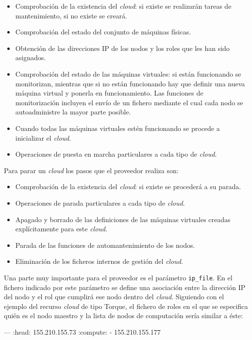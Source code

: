 \begin{itemize}
\item Comprobación de la existencia del \emph{cloud}: si existe se realizarán tareas de mantenimiento, si no existe se creará.
\item Comprobación del estado del conjunto de máquinas físicas.
\item Obtención de las direcciones IP de los nodos y los roles que les han sido asignados.
\item Comprobación del estado de las máquinas virtuales: si están funcionando se monitorizan, mientras que si no están funcionando hay que definir una nueva máquina virtual y ponerla en funcionamiento. Las funciones de monitorización incluyen el envío de un fichero mediante el cual cada nodo se autoadministre la mayor parte posible.
\item Cuando todas las máquinas virtuales estén funcionando se procede a inicializar el \emph{cloud}.
\item Operaciones de puesta en marcha particulares a cada tipo de \emph{cloud}.
\end{itemize}

Para parar un \emph{cloud} los pasos que el proveedor realiza son:

\begin{itemize}
\item Comprobación de la existencia del \emph{cloud}: si existe se procederá a su parada.
\item Operaciones de parada particulares a cada tipo de \emph{cloud}.
\item Apagado y borrado de las definiciones de las máquinas virtuales creadas explícitamente para este \emph{cloud}.
\item Parada de las funciones de automantenimiento de los nodos.
\item Eliminación de los ficheros internos de gestión del \emph{cloud}.
\end{itemize}

Una parte muy importante para el proveedor es el parámetro \texttt{ip\_file}. En el fichero indicado por este parámetro se define una asociación entre la dirección IP del nodo y el rol que cumplirá ese nodo dentro del \emph{cloud}. Siguiendo con el ejemplo del recurso \emph{cloud} de tipo Torque, el fichero de roles en el que se especifica quién es el nodo maestro y la lista de nodos de computación sería similar a éste:

\begin{yamlcode}
--- 
:head: 155.210.155.73
:compute:
- 155.210.155.177
\end{yamlcode}


